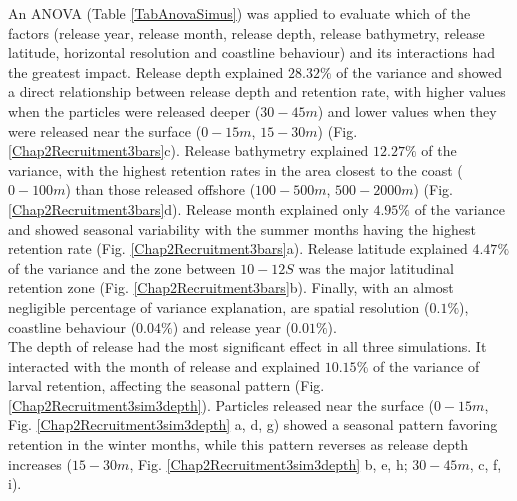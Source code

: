 An ANOVA (Table \ref{TabAnovaSimus}) was applied to evaluate which of the factors (release year, release month, release depth, release bathymetry, release latitude, horizontal resolution and coastline behaviour) and its interactions had the greatest impact. Release depth explained $28.32 \%$ of the variance and showed a direct relationship between release depth and retention rate, with higher values when the particles were released deeper ($30 - 45 m$) and lower values when they were released near the surface ($0 - 15 m$, $15 - 30 m$) (Fig. \ref{Chap2Recruitment3bars}c). Release bathymetry explained $12.27 \%$ of the variance, with the highest retention rates in the area closest to the coast ($0 - 100 m$) than those released offshore ($100 - 500 m$, $500 - 2000 m$) (Fig. \ref{Chap2Recruitment3bars}d). Release month explained only $4.95 \%$ of the variance and showed seasonal variability with the summer months having the highest retention rate (Fig. \ref{Chap2Recruitment3bars}a). Release latitude explained $4.47 \%$ of the variance and the zone between $10 - 12$\textdegree $S$ was the major latitudinal retention zone (Fig. \ref{Chap2Recruitment3bars}b). Finally, with an almost negligible percentage of variance explanation, are spatial resolution ($0.1 \%$), coastline behaviour ($0.04 \%$) and release year ($0.01 \%$).\\

The depth of release had the most significant effect in all three simulations. It interacted with the month of release and explained $10.15 \%$ of the variance of larval retention, affecting the seasonal pattern (Fig. \ref{Chap2Recruitment3sim3depth}). Particles released near the surface ($0-15 m$, Fig. \ref{Chap2Recruitment3sim3depth} a, d, g) showed a seasonal pattern favoring retention in the winter months, while this pattern reverses as release depth increases ($15 - 30 m$, Fig. \ref{Chap2Recruitment3sim3depth} b, e, h; $30 - 45 m$, c, f, i).\\

